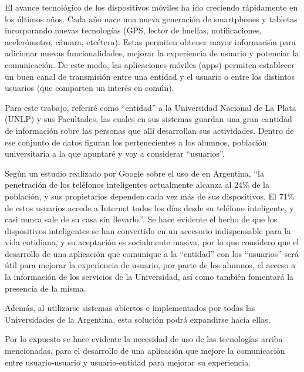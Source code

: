 El avance tecnológico de los dispositivos móviles ha ido creciendo rápidamente
en los últimos años. Cada año nace una nueva generación de smartphones y
tabletas incorporando nuevas tecnologías (GPS, lector de huellas,
notificaciones, acelerómetro, cámara, etcétera). Estas permiten obtener mayor
información para adicionar nuevas funcionalidades, mejorar la experiencia de
usuario y potenciar la comunicación. De este modo, las aplicaciones móviles
(apps) permiten establecer un buen canal de transmisión entre una entidad y el
usuario o entre los distintos usuarios (que comparten un interés en común).

Para este trabajo, referiré como “entidad” a la Universidad Nacional de La Plata
(UNLP) y sus Facultades, las cuales en sus sistemas guardan una gran cantidad
de información sobre las personas que allí desarrollan sus actividades. Dentro
de ese conjunto de datos figuran los pertenecientes a los alumnos, población
universitaria a la que apuntaré y voy a considerar “usuarios”.

Según un estudio realizado por Google sobre el uso de 
en Argentina, \cite{GoogleEstudioSmartphones} ``la penetración de los teléfonos
inteligentes actualmente alcanza al 24\% de la población, y sus propietarios
dependen cada vez más de sus dispositivos. El 71\% de estos usuarios accede a
Internet todos los días desde su teléfono inteligente, y casi nunca sale de su
casa sin llevarlo.''. Se hace evidente el hecho de que los dispositivos
inteligentes se han convertido en un accesorio indispensable para la vida
cotidiana, y su aceptación es socialmente masiva, por lo que considero que el
desarrollo de una aplicación que comunique a la “entidad” con los “usuarios”
será útil para mejorar la experiencia de usuario, por parte de los alumnos, el
acceso a la información de los servicios de la Universidad, así como también
fomentará la presencia de la misma.

Además, al utilizarse sistemas abiertos e implementados por todas las
Universidades de la Argentina, esta solución podrá expandirse hacia ellas.

Por lo expuesto se hace evidente la necesidad de uso de
las tecnologías arriba mencionadas, para el desarrollo de una aplicación que
mejore la comunicación entre usuario-usuario y usuario-entidad para mejorar su
experiencia.
